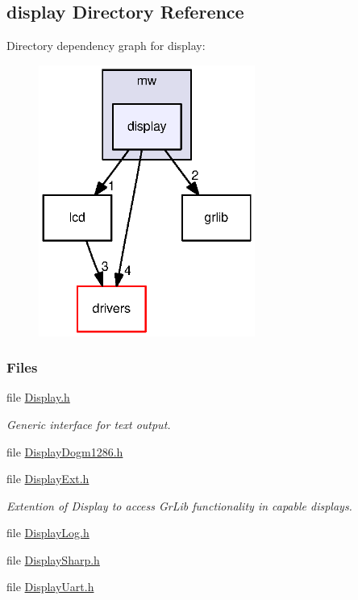\subsection{display Directory Reference}
\label{dir_8225ead4c6b469145b1f14ab46e89e14}
Directory dependency graph for display\+:
\nopagebreak
\begin{figure}[H]
\begin{center}
\leavevmode
\includegraphics[width=201pt]{dir_8225ead4c6b469145b1f14ab46e89e14_dep}
\end{center}
\end{figure}
\subsubsection*{Files}
\begin{DoxyCompactItemize}
\item 
file \hyperlink{_display_8h}{Display.\+h}
\begin{DoxyCompactList}\small\item\em Generic interface for text output. \end{DoxyCompactList}\item 
file \hyperlink{_display_dogm1286_8h}{Display\+Dogm1286.\+h}
\item 
file \hyperlink{_display_ext_8h}{Display\+Ext.\+h}
\begin{DoxyCompactList}\small\item\em Extention of Display to access Gr\+Lib functionality in capable displays. \end{DoxyCompactList}\item 
file \hyperlink{_display_log_8h}{Display\+Log.\+h}
\item 
file \hyperlink{_display_sharp_8h}{Display\+Sharp.\+h}
\item 
file \hyperlink{_display_uart_8h}{Display\+Uart.\+h}
\end{DoxyCompactItemize}
